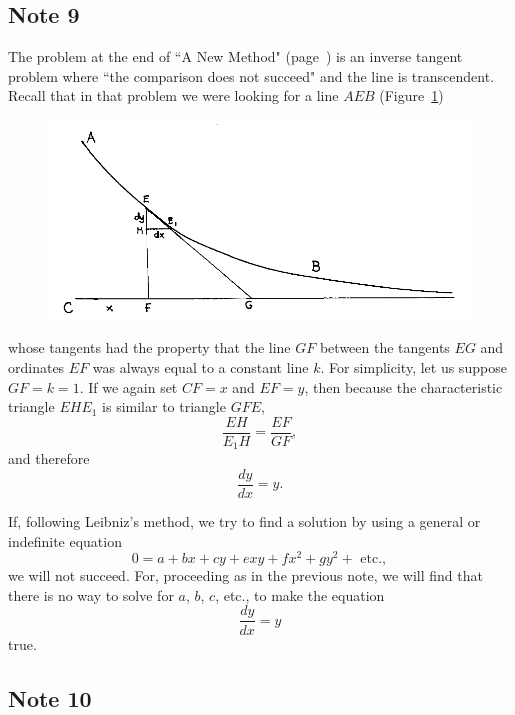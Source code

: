 \documentclass[twoside,openright]{article}
\begin{document}
\subsection*{Note 9}
\label{crg9}

The problem at the end of ``A New Method" (page~\pageref{begdeb}) is
an inverse tangent problem where ``the comparison does not succeed"
and the line is transcendent.  Recall that in that problem we were
looking for a line $AEB$ (Figure~\ref{transcurv})
\begin{figure}[htp]
\begin{center}
\includegraphics[width=\textwidth]{fig/Figure34}
\caption{}
\label{transcurv}
\vspace{-10pt}
\end{center}
\end{figure} whose tangents had the property that the line $GF$
between the tangents $EG$ and ordinates $EF$ was always equal to a
constant line $k$.  For simplicity, let us suppose $GF= k=1$.  If we
again set $CF =x$ and $EF=y$, then because the characteristic triangle
$EHE_1$ is similar to triangle $GFE$,
$$\frac{EH}{E_1H} = \frac{EF}{GF},$$
and therefore
\begin{equation}
\frac{dy}{dx} = y.
\end{equation}

If, following Leibniz's method, we try to find a solution by using a general or indefinite equation
\begin{equation}
 0 = a + bx + cy + exy + fx^2 + gy^2 + \mbox{ etc.},
 \end{equation}
 we will not succeed.  For, proceeding as in the previous note, we
 will find that there is no way to solve for $a$, $b$, $c$, etc., to
 make the equation
$$\frac{dy}{dx} = y$$
true.
\setcounter{equation}{0}

\subsection*{Note 10}
\label{crg10}
\end{document}
